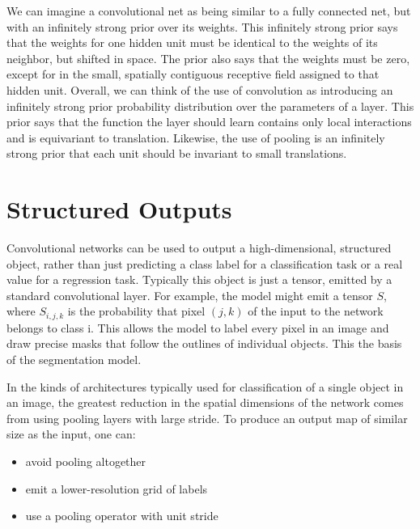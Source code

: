 We can imagine a convolutional net as being similar to a fully connected net, but with an infinitely strong prior over its weights.
This infinitely strong prior says that the weights for one hidden unit must be identical to the weights of its neighbor, but shifted in space.
The prior also says that the weights must be zero, except for in the small, spatially contiguous receptive field assigned to that hidden unit.
Overall, we can think of the use of convolution as introducing an infinitely strong prior probability distribution over the parameters of a layer.
This prior says that the function the layer should learn contains only local interactions and is equivariant to translation.
Likewise, the use of pooling is an infinitely strong prior that each unit should be invariant to small translations.




\section{Structured Outputs}

Convolutional networks can be used to output a high-dimensional, structured object, rather than just predicting a class label for a classification task or a real value for a regression task.
Typically this object is just a tensor, emitted by a standard convolutional layer.
For example, the model might emit a tensor $S$, where $S_{i,j,k}$ is the probability that pixel $(j,k)$ of the input to the network belongs to class i.
This allows the model to label every pixel in an image and draw precise masks that follow the outlines of individual objects.
This the basis of the segmentation model.



In the kinds of architectures typically used for classification of a single object in an image, the greatest reduction in the spatial dimensions of the network comes from using pooling layers with large stride.
To produce an output map of similar size as the input, one can:
\begin{itemize}
\item avoid pooling altogether
\item emit a lower-resolution grid of labels
\item use a pooling operator with unit stride
\end{itemize}


